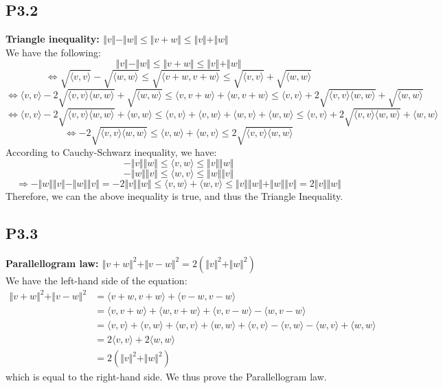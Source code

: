 \documentclass[12pt]{article}
\begin{document}
\subsection*{P3.2}
\textbf{Triangle inequality: $\Vert v\Vert-\Vert w\Vert\leq \Vert v+w\Vert\leq \Vert v\Vert+\Vert w\Vert$}\\
We have the following:
$$\Vert v\Vert-\Vert w\Vert\leq \Vert v+w\Vert\leq \Vert v\Vert+\Vert w\Vert$$
$$\Leftrightarrow \sqrt{\langle v,v \rangle} -\sqrt{\langle w,w \rangle} \leq \sqrt{\langle v+w, v+w \rangle} \leq \sqrt{\langle v,v \rangle} +\sqrt{\langle w,w \rangle}$$
$$\Leftrightarrow \langle v,v \rangle -2\sqrt{\langle v,v \rangle\langle w,w \rangle} +\sqrt{\langle w,w \rangle} \leq \langle v, v+w \rangle + \langle w, v+w \rangle \leq \langle v,v \rangle +2\sqrt{\langle v,v \rangle\langle w,w \rangle} +\sqrt{\langle w,w \rangle}$$
$$\Leftrightarrow \langle v,v \rangle -2\sqrt{\langle v,v \rangle\langle w,w \rangle} +\langle w,w \rangle \leq \langle v, v \rangle + \langle v, w \rangle + \langle w, v \rangle + \langle w, w \rangle\leq \langle v,v \rangle +2\sqrt{\langle v,v \rangle\langle w,w \rangle} +\langle w,w \rangle$$
$$\Leftrightarrow -2\sqrt{\langle v,v \rangle\langle w,w \rangle} \leq \langle v, w \rangle + \langle w, v \rangle \leq 2\sqrt{\langle v,v \rangle\langle w,w \rangle}$$ 
According to Cauchy-Schwarz inequality, we have:
$$-\Vert v \Vert \Vert w \Vert\leq \langle v, w \rangle \leq \Vert v \Vert \Vert w \Vert$$
$$- \Vert w \Vert \Vert v \Vert \leq \langle w, v \rangle \leq \Vert w \Vert \Vert v \Vert$$
$$\Rightarrow - \Vert w \Vert \Vert v \Vert - \Vert w \Vert \Vert v \Vert = -2\Vert v \Vert  \Vert w \Vert \leq \langle v, w \rangle + \langle w, v \rangle \leq \Vert v \Vert \Vert w \Vert+ \Vert w \Vert \Vert v \Vert = 2\Vert v \Vert \Vert w \Vert$$
Therefore, we can the above inequality is true, and thus the Triangle Inequality.



\subsection*{P3.3}
\textbf{Parallellogram law:  $\Vert v+w\Vert^2 + \Vert v-w\Vert^2 =2 (\Vert v\Vert^2+\Vert w\Vert^2)$}\\
We have the left-hand side of the equation:
\begin{align*}
\Vert v+w\Vert^2 + \Vert v-w\Vert^2 &= \langle v+w,v+w \rangle +  \langle v-w,v-w \rangle\\
& = \langle v,v+w \rangle + \langle w, v+w \rangle + \langle v, v-w \rangle - \langle w, v-w \rangle\\
& = \langle v, v \rangle + \langle v, w \rangle + \langle w, v \rangle + \langle w, w \rangle + \langle v, v \rangle - \langle v, w \rangle - \langle w, v \rangle + \langle w, w \rangle\\
&= 2\langle v,v \rangle + 2\langle w,w \rangle\\
&= 2(\Vert v \Vert^2 + \Vert w \Vert^2)
\end{align*}
which is equal to the right-hand side. We thus prove the Parallellogram law.
\end{document}
